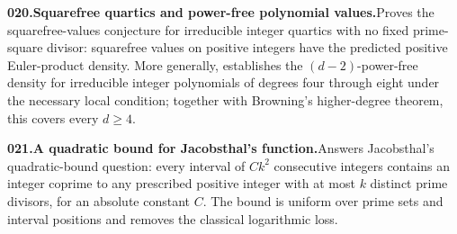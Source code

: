 \documentclass[11pt,a4paper]{article}
\begin{document}
  \par \begin{minipage}{\linewidth}
  \fontsize{10.5}{12.6}\selectfont\RaggedRight
  \hypertarget{result 020}{}
  {\bfseries\textcolor{muted}{020.}\enspace Squarefree quartics and power-free polynomial values.}\enspace Proves the squarefree-values conjecture for irreducible integer quartics with no fixed prime-square divisor: squarefree values on positive integers have the predicted positive Euler-product density. More generally, establishes the $(d-2)$-power-free density for irreducible integer polynomials of degrees four through eight under the necessary local condition; together with Browning's higher-degree theorem, this covers every $d\ge4$.\par
  \end{minipage}\par\vspace{5pt}



  \par \begin{minipage}{\linewidth}
  \fontsize{10.5}{12.6}\selectfont\RaggedRight
  \hypertarget{result 021}{}
  {\bfseries\textcolor{muted}{021.}\enspace A quadratic bound for Jacobsthal's function.}\enspace Answers Jacobsthal's quadratic-bound question: every interval of $Ck^2$ consecutive integers contains an integer coprime to any prescribed positive integer with at most $k$ distinct prime divisors, for an absolute constant $C$. The bound is uniform over prime sets and interval positions and removes the classical logarithmic loss.\par
  \end{minipage}\par\vspace{5pt}
\end{document}
